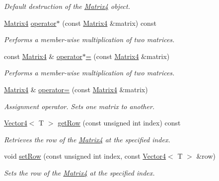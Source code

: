 \begin{DoxyCompactItemize}
\begin{DoxyCompactList}\small\item\em Default destruction of the \hyperlink{classsparky_1_1_matrix4}{Matrix4} object. \end{DoxyCompactList}\item 
\hyperlink{classsparky_1_1_matrix4}{Matrix4} \hyperlink{classsparky_1_1_matrix4_af9f51ecead11967660a90e92816a1a3e}{operator$\ast$} (const \hyperlink{classsparky_1_1_matrix4}{Matrix4} \&matrix) const 
\begin{DoxyCompactList}\small\item\em Performs a member-\/wise multiplication of two matrices. \end{DoxyCompactList}\item 
const \hyperlink{classsparky_1_1_matrix4}{Matrix4} \& \hyperlink{classsparky_1_1_matrix4_a59dafae6ca61b89bfb6c2be4a0e39a1c}{operator$\ast$=} (const \hyperlink{classsparky_1_1_matrix4}{Matrix4} \&matrix)
\begin{DoxyCompactList}\small\item\em Performs a member-\/wise multiplication of two matrices. \end{DoxyCompactList}\item 
\hyperlink{classsparky_1_1_matrix4}{Matrix4} \& \hyperlink{classsparky_1_1_matrix4_a043e053309d005f6a165e8266d1851bb}{operator=} (const \hyperlink{classsparky_1_1_matrix4}{Matrix4} \&matrix)
\begin{DoxyCompactList}\small\item\em Assignment operator. Sets one matrix to another. \end{DoxyCompactList}\item 
\hyperlink{classsparky_1_1_vector4}{Vector4}$<$ T $>$ \hyperlink{classsparky_1_1_matrix4_abdcce27f8453f88a1ee9a7a29b60d183}{get\+Row} (const unsigned int index) const 
\begin{DoxyCompactList}\small\item\em Retrieves the row of the \hyperlink{classsparky_1_1_matrix4}{Matrix4} at the specified index. \end{DoxyCompactList}\item 
void \hyperlink{classsparky_1_1_matrix4_aabbc492092a0ac18ce4492203ea799cc}{set\+Row} (const unsigned int index, const \hyperlink{classsparky_1_1_vector4}{Vector4}$<$ T $>$ \&row)
\begin{DoxyCompactList}\small\item\em Sets the row of the \hyperlink{classsparky_1_1_matrix4}{Matrix4} at the specified index. \end{DoxyCompactList}\item 

\end{DoxyCompactItemize}
